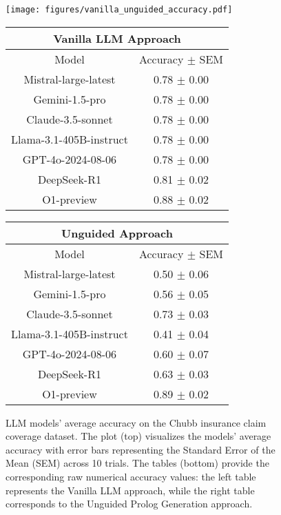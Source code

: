 \begin{figure*}[ht]
    \centering
    \begin{minipage}{1\textwidth}
    \centering                  \texttt{[image: figures/vanilla\_unguided\_accuracy.pdf]}
    \end{minipage}
    
    \begin{minipage}{0.48\textwidth}
    \centering
    \begin{tabular}{|c|c|}
    \hline
    \multicolumn{2}{|c|}{\textbf{Vanilla LLM Approach}} \\ \hline
    Model & Accuracy $\pm$ SEM \\ \hline
    Mistral-large-latest & 0.78 $\pm$ 0.00 \\ \hline
    Gemini-1.5-pro & 0.78 $\pm$ 0.00 \\ \hline
    Claude-3.5-sonnet & 0.78 $\pm$ 0.00 \\ \hline
    Llama-3.1-405B-instruct & 0.78 $\pm$ 0.00 \\ \hline
    GPT-4o-2024-08-06 & 0.78 $\pm$ 0.00 \\ \hline
    DeepSeek-R1 & 0.81 $\pm$ 0.02 \\ \hline
    O1-preview & 0.88 $\pm$ 0.02 \\ \hline
    \end{tabular}
    \end{minipage}
    \hfill
    \begin{minipage}{0.48\textwidth}
    \centering
    \begin{tabular}{|c|c|}
    \hline
    \multicolumn{2}{|c|}{\textbf{Unguided Approach}} \\ \hline
    Model & Accuracy $\pm$ SEM \\ \hline
    Mistral-large-latest & 0.50 $\pm$ 0.06 \\ \hline
    Gemini-1.5-pro & 0.56 $\pm$ 0.05 \\ \hline
    Claude-3.5-sonnet & 0.73 $\pm$ 0.03 \\ \hline
    Llama-3.1-405B-instruct & 0.41 $\pm$ 0.04 \\ \hline
    GPT-4o-2024-08-06 & 0.60 $\pm$ 0.07 \\ \hline
    DeepSeek-R1 & 0.63 $\pm$ 0.03 \\ \hline
    O1-preview & 0.89 $\pm$ 0.02 \\ \hline
    \end{tabular}
    \end{minipage}
    
    \caption{LLM models' average accuracy on the Chubb insurance claim coverage dataset. 
    The plot (top) visualizes the models' average accuracy with error bars representing the Standard Error of the Mean (SEM) across 10 trials. 
    The tables (bottom) provide the corresponding raw numerical accuracy values: the left table represents the Vanilla LLM approach, while the right table corresponds to the Unguided Prolog Generation approach.}    
    \label{fig:vanilla_unguided_chubb}
\end{figure*}


